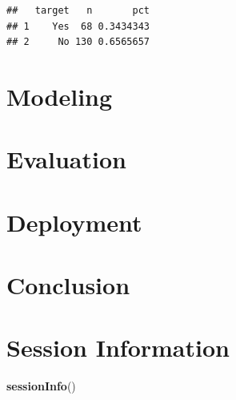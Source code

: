\documentclass[
]{article}
\newenvironment{Shaded}{\begin{snugshade}}{\end{snugshade}}
\newcommand{\FunctionTok}[1]{\textcolor[rgb]{0.13,0.29,0.53}{\textbf{#1}}}
\newcommand{\NormalTok}[1]{#1}
\begin{document}
\begin{verbatim}
##   target   n       pct
## 1    Yes  68 0.3434343
## 2     No 130 0.6565657
\end{verbatim}

\newpage

\section{\texorpdfstring{\textbf{Modeling}}{Modeling}}\label{modeling}

\newpage

\section{\texorpdfstring{\textbf{Evaluation}}{Evaluation}}\label{evaluation}

\newpage

\section{\texorpdfstring{\textbf{Deployment}}{Deployment}}\label{deployment}

\newpage

\section{\texorpdfstring{\textbf{Conclusion}}{Conclusion}}\label{conclusion}

\newpage

\section{\texorpdfstring{\textbf{Session
Information}}{Session Information}}\label{session-information}

\begin{Shaded}
\begin{Highlighting}[]
\FunctionTok{sessionInfo}\NormalTok{()}
\end{Highlighting}
\end{Shaded}
\end{document}
